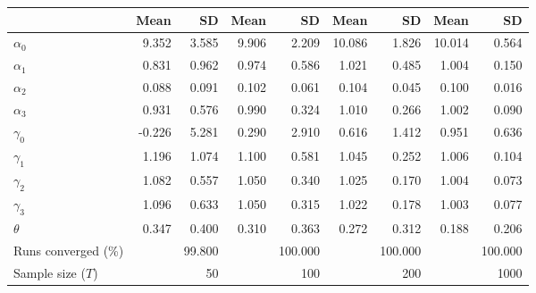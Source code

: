 
\begin{tabular}[t]{lrrrrrrrr}
\toprule
  & Mean & SD & Mean  & SD  & Mean   & SD   & Mean    & SD   \\
\midrule
$\alpha_{0}$ & 9.352 & 3.585 & 9.906 & 2.209 & 10.086 & 1.826 & 10.014 & 0.564\\
$\alpha_{1}$ & 0.831 & 0.962 & 0.974 & 0.586 & 1.021 & 0.485 & 1.004 & 0.150\\
$\alpha_{2}$ & 0.088 & 0.091 & 0.102 & 0.061 & 0.104 & 0.045 & 0.100 & 0.016\\
$\alpha_{3}$ & 0.931 & 0.576 & 0.990 & 0.324 & 1.010 & 0.266 & 1.002 & 0.090\\
$\gamma_{0}$ & -0.226 & 5.281 & 0.290 & 2.910 & 0.616 & 1.412 & 0.951 & 0.636\\
$\gamma_{1}$ & 1.196 & 1.074 & 1.100 & 0.581 & 1.045 & 0.252 & 1.006 & 0.104\\
$\gamma_{2}$ & 1.082 & 0.557 & 1.050 & 0.340 & 1.025 & 0.170 & 1.004 & 0.073\\
$\gamma_{3}$ & 1.096 & 0.633 & 1.050 & 0.315 & 1.022 & 0.178 & 1.003 & 0.077\\
$\theta$ & 0.347 & 0.400 & 0.310 & 0.363 & 0.272 & 0.312 & 0.188 & 0.206\\
Runs converged (\%) &  & 99.800 &  & 100.000 &  & 100.000 &  & 100.000\\
Sample size ($T$) &  & 50 &  & 100 &  & 200 &  & 1000\\
\bottomrule
\end{tabular}

